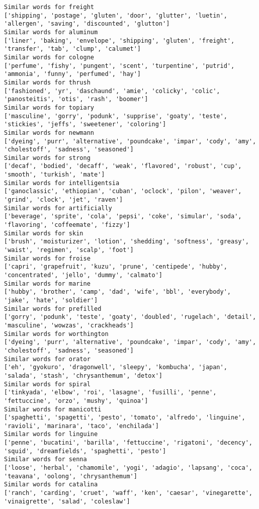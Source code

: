 \documentclass[11pt]{article}
\begin{document}
\begin{Verbatim}[commandchars=\\\{\}]
Similar words for freight
['shipping', 'postage', 'gluten', 'door', 'glutter', 'luetin', 'allergen', 'saving', 'discounted', 'glutton']
Similar words for aluminum
['liner', 'baking', 'envelope', 'shipping', 'gluten', 'freight', 'transfer', 'tab', 'clump', 'calumet']
Similar words for cologne
['perfume', 'fishy', 'pungent', 'scent', 'turpentine', 'putrid', 'ammonia', 'funny', 'perfumed', 'hay']
Similar words for thrush
['fashioned', 'yr', 'daschaund', 'amie', 'colicky', 'colic', 'panosteitis', 'otis', 'rash', 'boomer']
Similar words for topiary
['masculine', 'gorry', 'podunk', 'supprise', 'goaty', 'teste', 'stickies', 'jeffs', 'sweetener', 'coloring']
Similar words for newmann
['dyeing', 'purr', 'alternative', 'poundcake', 'impar', 'cody', 'amy', 'cholestoff', 'sadness', 'seasoned']
Similar words for strong
['decaf', 'bodied', 'decaff', 'weak', 'flavored', 'robust', 'cup', 'smooth', 'turkish', 'mate']
Similar words for intelligentsia
['ganoclassic', 'ethiopian', 'cuban', 'oclock', 'pilon', 'weaver', 'grind', 'clock', 'jet', 'raven']
Similar words for artificially
['beverage', 'sprite', 'cola', 'pepsi', 'coke', 'simular', 'soda', 'flavoring', 'coffeemate', 'fizzy']
Similar words for skin
['brush', 'moisturizer', 'lotion', 'shedding', 'softness', 'greasy', 'waist', 'regimen', 'scalp', 'foot']
Similar words for froise
['capri', 'grapefruit', 'kuzu', 'prune', 'centipede', 'hubby', 'concentrated', 'jello', 'dummy', 'calmato']
Similar words for marine
['hubby', 'brother', 'camp', 'dad', 'wife', 'bbl', 'everybody', 'jake', 'hate', 'soldier']
Similar words for prefilled
['gorry', 'podunk', 'teste', 'goaty', 'doubled', 'rugelach', 'detail', 'masculine', 'wowzas', 'crackheads']
Similar words for worthington
['dyeing', 'purr', 'alternative', 'poundcake', 'impar', 'cody', 'amy', 'cholestoff', 'sadness', 'seasoned']
Similar words for orator
['eh', 'gyokuro', 'dragonwell', 'sleepy', 'kombucha', 'japan', 'salada', 'stash', 'chrysanthemum', 'detox']
Similar words for spiral
['tinkyada', 'elbow', 'roi', 'lasagne', 'fusilli', 'penne', 'fettuccine', 'orzo', 'mushy', 'quinoa']
Similar words for manicotti
['spaghetti', 'spagetti', 'pesto', 'tomato', 'alfredo', 'linguine', 'ravioli', 'marinara', 'taco', 'enchilada']
Similar words for linguine
['penne', 'bucatini', 'barilla', 'fettuccine', 'rigatoni', 'decency', 'squid', 'dreamfields', 'spaghetti', 'pesto']
Similar words for senna
['loose', 'herbal', 'chamomile', 'yogi', 'adagio', 'lapsang', 'coca', 'teavana', 'oolong', 'chrysanthemum']
Similar words for catalina
['ranch', 'carding', 'cruet', 'waff', 'ken', 'caesar', 'vinegarette', 'vinaigrette', 'salad', 'coleslaw']

\end{Verbatim}
\end{document}
